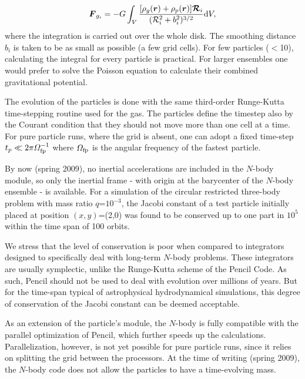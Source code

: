 \documentclass[\mydriver,12pt,twoside,notitlepage,a4paper]{article}
\newcommand{\de}      {\mathrm{d}}
\renewcommand{\vec}[1]{\mbox{\boldmath{$#1$}}}
\newcommand{\ttimes}[1]{10^{#1}}
\begin{document}
\begin{equation}
  {\vec{F}}_{g_i} = -G\int_{V} \frac{[\rho_g(\vec{r})+\rho_p(\vec{r})]\vec{{\mathcal R}}_i}{({\mathcal R}_i^2 + b_i^2)^{3/2}} \de V,
  \label{eq:disk-gravity}
\end{equation}where the integration is carried out over the whole disk. The
smoothing distance $b_i$ is taken to be as small as possible
(a few grid cells). For few particles ($<$10), calculating the integral
for every particle is practical. For larger ensembles one would prefer to
solve the Poisson equation to calculate their combined gravitational
potential.

The evolution of the particles is done with the same third-order Runge-Kutta
time-stepping routine used for the gas. The particles define the timestep also
by the Courant condition that they should not move more than one cell at a time.
For pure particle runs, where the grid is absent, one can adopt a
fixed time-step $t_p \ll 2\pi\varOmega_{\rm fp}^{-1}$ where
$\varOmega_{\rm fp}$ is the angular frequency of the fastest particle.

By now (spring 2009), no inertial accelerations are included in the $N$-body module, so only the
inertial frame - with origin at the barycenter of the $N$-body ensemble -
is available. For a simulation of the circular restricted three-body problem
with mass ratio $q$=$\ttimes{-3}$, the Jacobi constant of a test particle
initially placed at position $(x,y)$=(2,0) was found to be conserved up
to one part in $\ttimes{5}$ within the time span of 100 orbits.


We stress that the level of conservation is poor when compared to integrators designed to specifically
deal with long-term $N$-body problems. These integrators are usually symplectic, unlike the Runge-Kutta
scheme of the {\sc Pencil Code}. As such, {\sc Pencil} should not be used to deal with evolution over millions of
years. But for the time-span typical of astrophysical hydrodynamical
simulations, this degree of conservation of the Jacobi constant can be
deemed acceptable.

As an extension of the particle's module, the $N$-body is fully compatible
with the parallel optimization of {\sc Pencil}, which further speeds up the
calculations. Parallelization, however, is not yet possible for pure particle
runs, since it relies on splitting the grid between the processors. At the
time of writing (spring 2009), the $N$-body code does not allow the particles
to have a time-evolving mass.
\end{document}
